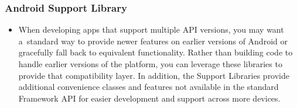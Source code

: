 \documentclass[10pt,xcolor=pdflatex]{beamer}
\begin{document}
\begin{frame}\frametitle{Android Support Library}
	\begin{itemize}
      \item {\footnotesize When developing apps that support multiple API versions, you may want a~standard way to provide newer features on earlier versions of Android or gracefully fall back to equivalent functionality. Rather than building code to handle earlier versions of the platform, you can leverage these libraries to provide that compatibility layer. In addition, the Support Libraries provide additional convenience classes and features not available in the standard Framework API for easier development and support across more devices.}
    \end{itemize}
\end{frame}
\end{document}
